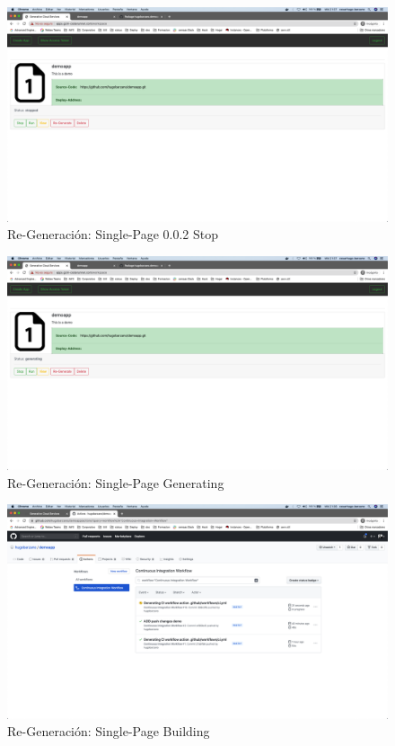 \documentclass[a4paper,11pt]{book}
\begin{document}
   \begin{figure}[H]
\centering
\includegraphics[scale=0.2]{imagenes/casouso/4_2.png}
\caption{  Re-Generación: Single-Page 0.0.2 Stop}
\end{figure}


   \begin{figure}[H]
\centering
\includegraphics[scale=0.2]{imagenes/casouso/4_3.png}
\caption{ Re-Generación: Single-Page Generating  }
\end{figure}


   \begin{figure}[H]
\centering
\includegraphics[scale=0.2]{imagenes/casouso/4_4.png}
\caption{  Re-Generación: Single-Page Building }
\end{figure}
\end{document}
